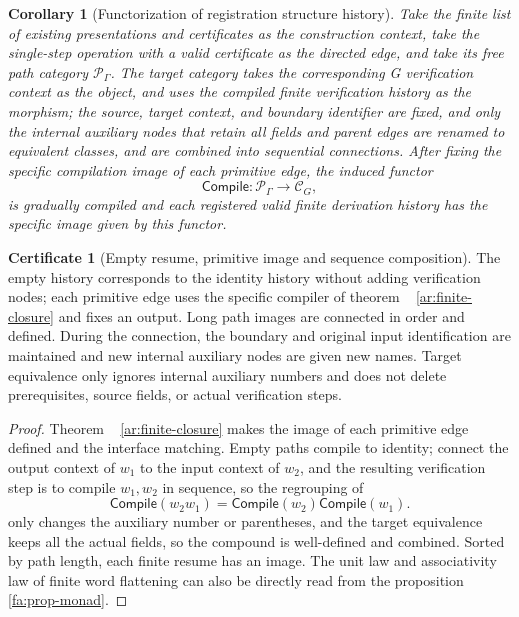 \documentclass[11pt,a4paper]{article}
\theoremstyle{plain}
\newtheorem{corollary}[theorem]{Corollary}
\theoremstyle{definition}
\newtheorem*{certificate}{Certificate}
\theoremstyle{remark}
\begin{document}
\begin{CJK*}
\begin{corollary}
[Functorization of registration structure history]\label{ar:functor}
Take the finite list of existing presentations and certificates as the construction context, take the single-step operation with a valid certificate as the directed edge, and take its free path category $\mathcal P_\Gamma$. The target category takes the corresponding G verification context as the object, and uses the compiled finite verification history as the morphism; the source, target context, and boundary identifier are fixed, and only the internal auxiliary nodes that retain all fields and parent edges are renamed to equivalent classes, and are combined into sequential connections. After fixing the specific compilation image of each primitive edge, the induced functor \[
 \mathsf{Compile}:\mathcal P_\Gamma\longrightarrow\mathcal C_G,
\] is gradually compiled and each registered valid finite derivation history has the specific image given by this functor.\end{corollary}
\begin{certificate}
[Empty resume, primitive image and sequence composition]The empty history corresponds to the identity history without adding verification nodes; each primitive edge uses the specific compiler of theorem ~ \ref{ar:finite-closure} and fixes an output. Long path images are connected in order and defined. During the connection, the boundary and original input identification are maintained and new internal auxiliary nodes are given new names. Target equivalence only ignores internal auxiliary numbers and does not delete prerequisites, source fields, or actual verification steps.\end{certificate}
\begin{proof}
Theorem ~ \ref{ar:finite-closure} makes the image of each primitive edge defined and the interface matching. Empty paths compile to identity; connect the output context of $w_1$ to the input context of $w_2$, and the resulting verification step is to compile $w_1,w_2$ in sequence, so the regrouping of \[
 \mathsf{Compile}(w_2w_1)
 =\mathsf{Compile}(w_2)\mathsf{Compile}(w_1).
\] only changes the auxiliary number or parentheses, and the target equivalence keeps all the actual fields, so the compound is well-defined and combined. Sorted by path length, each finite resume has an image. The unit law and associativity law of finite word flattening can also be directly read from the proposition ~ \ref{fa:prop-monad}.\end{proof}



\end{CJK*}
\end{document}
